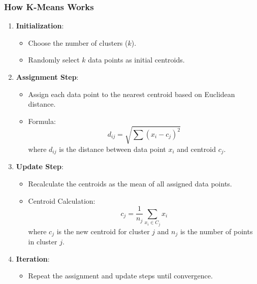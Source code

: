 \documentclass[aspectratio=169]{beamer}
\begin{document}
\begin{frame}[fragile]
    \frametitle{How K-Means Works}
    \begin{enumerate}
        \item \textbf{Initialization}:
            \begin{itemize}
                \item Choose the number of clusters ($k$).
                \item Randomly select $k$ data points as initial centroids.
            \end{itemize}

        \item \textbf{Assignment Step}:
            \begin{itemize}
                \item Assign each data point to the nearest centroid based on Euclidean distance.
                \item Formula: 
                \begin{equation}
                    d_{ij} = \sqrt{\sum (x_i - c_j)^2}
                \end{equation}
                where $d_{ij}$ is the distance between data point $x_i$ and centroid $c_j$.
            \end{itemize}

        \item \textbf{Update Step}:
            \begin{itemize}
                \item Recalculate the centroids as the mean of all assigned data points.
                \item Centroid Calculation:
                \begin{equation}
                    c_j = \frac{1}{n_j} \sum_{x_i \in C_j} x_i
                \end{equation}
                where $c_j$ is the new centroid for cluster $j$ and $n_j$ is the number of points in cluster $j$.
            \end{itemize}

        \item \textbf{Iteration}:
            \begin{itemize}
                \item Repeat the assignment and update steps until convergence.
            \end{itemize}
    \end{enumerate}
\end{frame}
\end{document}

